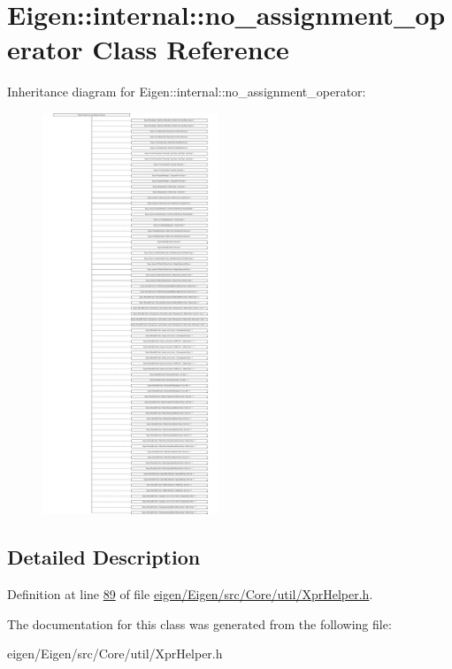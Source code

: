 \hypertarget{class_eigen_1_1internal_1_1no__assignment__operator}{}\section{Eigen\+:\+:internal\+:\+:no\+\_\+assignment\+\_\+operator Class Reference}
\label{class_eigen_1_1internal_1_1no__assignment__operator}
Inheritance diagram for Eigen\+:\+:internal\+:\+:no\+\_\+assignment\+\_\+operator\+:\begin{figure}[H]
\begin{center}
\leavevmode
\includegraphics[height=12.000000cm]{class_eigen_1_1internal_1_1no__assignment__operator}
\end{center}
\end{figure}


\subsection{Detailed Description}


Definition at line \hyperlink{eigen_2_eigen_2src_2_core_2util_2_xpr_helper_8h_source_l00089}{89} of file \hyperlink{eigen_2_eigen_2src_2_core_2util_2_xpr_helper_8h_source}{eigen/\+Eigen/src/\+Core/util/\+Xpr\+Helper.\+h}.



The documentation for this class was generated from the following file\+:\begin{DoxyCompactItemize}
\item 
eigen/\+Eigen/src/\+Core/util/\+Xpr\+Helper.\+h\end{DoxyCompactItemize}

